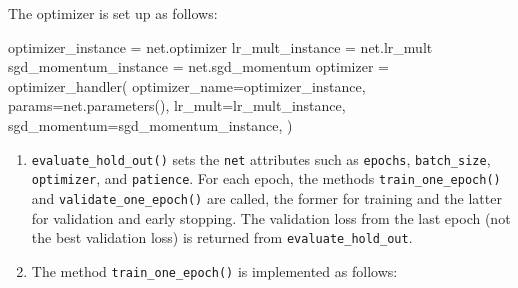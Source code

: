\documentclass[
  letterpaper,
  DIV=11,
  numbers=noendperiod]{scrreprt}
\newenvironment{Shaded}{\begin{snugshade}}{\end{snugshade}}
\newcommand{\NormalTok}[1]{\textcolor[rgb]{0.00,0.23,0.31}{#1}}
\providecommand{\tightlist}{%
  \setlength{\itemsep}{0pt}\setlength{\parskip}{0pt}}\usepackage{longtable,booktabs,array}
\begin{document}
The optimizer is set up as follows:

\begin{Shaded}
\begin{Highlighting}[]
\NormalTok{optimizer\_instance = net.optimizer}
\NormalTok{lr\_mult\_instance = net.lr\_mult}
\NormalTok{sgd\_momentum\_instance = net.sgd\_momentum}
\NormalTok{optimizer = optimizer\_handler(}
\NormalTok{    optimizer\_name=optimizer\_instance,}
\NormalTok{    params=net.parameters(),}
\NormalTok{    lr\_mult=lr\_mult\_instance,}
\NormalTok{    sgd\_momentum=sgd\_momentum\_instance,}
\NormalTok{)}
\end{Highlighting}
\end{Shaded}

\begin{enumerate}
\def\labelenumi{\arabic{enumi}.}
\setcounter{enumi}{2}
\tightlist
\item
  \texttt{evaluate\_hold\_out()} sets the \texttt{net} attributes such
  as \texttt{epochs}, \texttt{batch\_size}, \texttt{optimizer}, and
  \texttt{patience}. For each epoch, the methods
  \texttt{train\_one\_epoch()} and \texttt{validate\_one\_epoch()} are
  called, the former for training and the latter for validation and
  early stopping. The validation loss from the last epoch (not the best
  validation loss) is returned from \texttt{evaluate\_hold\_out}.
\item
  The method \texttt{train\_one\_epoch()} is implemented as follows:
\end{enumerate}
\end{document}
